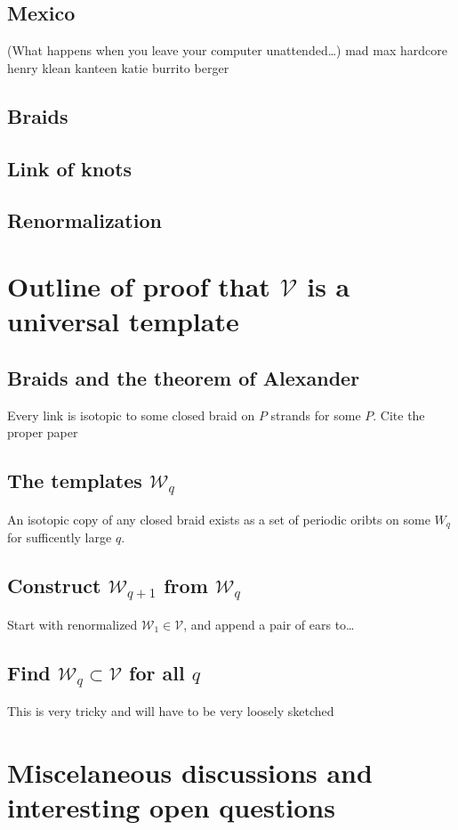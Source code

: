 \documentclass[11pt]{article}
\newcommand{\W}{\mathcal{W}}
\newcommand{\V}{\mathcal{V}}
\theoremstyle{plain}
\theoremstyle{definition}
\begin{document}
\subsection{Mexico}
(What happens when you leave your computer unattended\dots)
mad max
hardcore henry
klean kanteen katie
burrito berger

\subsection{Braids}

\subsection{Link of knots}

\subsection{Renormalization}

\section{Outline of proof that $\mathcal{V}$ is a universal template}

\subsection{Braids and the theorem of Alexander}

Every link is isotopic to some closed braid on $P$ strands for some $P$. Cite the proper paper

\subsection{The templates $\W_q$}

An isotopic copy of any closed braid exists as a set of periodic oribts on some $W_q$ for sufficently large $q$.

\subsection{Construct $\W_{q+1}$ from $\W_q$}

Start with renormalized $\W_1 \in \V$, and append a pair of ears to\dots

\subsection{Find $\W_q \subset \V$ for all $q$}

This is very tricky and will have to be very loosely sketched




\section{Miscelaneous discussions and interesting open questions}
\end{document}
